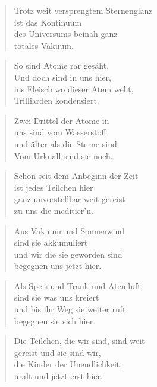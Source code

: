 \documentclass[10pt,a4paper]{article}
\begin{document}
\begin{multicols}{2}
\begin{verse}
Trotz weit versprengtem Sternenglanz \\
ist das Kontinuum \\
des Universums beinah ganz \\
totales Vakuum. \\
\end{verse}

\begin{verse}
So sind Atome rar gesäht. \\
Und doch sind in uns hier, \\
ins Fleisch wo dieser Atem weht, \\
Trilliarden kondensiert. \\
\end{verse}

\begin{verse}
Zwei Drittel der Atome in \\
uns sind vom Wasserstoff \\
und älter als die Sterne sind. \\
Vom Urknall sind sie noch. \\
\end{verse}

\begin{verse}
Schon seit dem Anbeginn der Zeit \\
ist jedes Teilchen hier \\
ganz unvorstellbar weit gereist \\
zu uns die meditier’n. \\
\end{verse}

\begin{verse}
Aus Vakuum und Sonnenwind \\
sind sie akkumuliert \\
und wir die sie geworden sind \\
begegnen uns jetzt hier. \\
\end{verse}

\begin{verse}
Als Speis und Trank und Atemluft \\
sind sie was uns kreiert \\
und bis ihr Weg sie weiter ruft \\
begegnen sie sich hier. \\
\end{verse}

\begin{verse}
Die Teilchen, die wir sind, sind weit \\
gereist und sie sind wir, \\
die Kinder der Unendlichkeit, \\
uralt und jetzt erst hier. \\
\end{verse}


\end{multicols}
\end{document}
